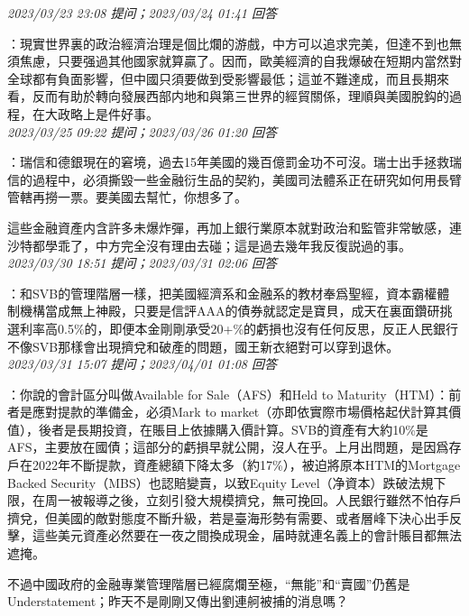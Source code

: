 \documentclass[twocolumn]{ctexart}
\begin{document}
\textit{\hfill\noindent\small 2023/03/23 23:08 提问；2023/03/24 01:41 回答}

：現實世界裏的政治經濟治理是個比爛的游戲，中方可以追求完美，但達不到也無須焦慮，只要强過其他國家就算贏了。因而，歐美經濟的自我爆破在短期内當然對全球都有負面影響，但中國只須要做到受影響最低；這並不難達成，而且長期來看，反而有助於轉向發展西部内地和與第三世界的經貿關係，理順與美國脫鈎的過程，在大政略上是件好事。
\\

\textit{\hfill\noindent\small 2023/03/25 09:22 提问；2023/03/26 01:20 回答}

：瑞信和德銀現在的窘境，過去15年美國的幾百億罰金功不可沒。瑞士出手拯救瑞信的過程中，必須撕毀一些金融衍生品的契約，美國司法體系正在研究如何用長臂管轄再撈一票。要美國去幫忙，你想多了。

這些金融資產内含許多未爆炸彈，再加上銀行業原本就對政治和監管非常敏感，連沙特都學乖了，中方完全沒有理由去碰；這是過去幾年我反復説過的事。
\\

\textit{\hfill\noindent\small 2023/03/30 18:51 提问；2023/03/31 02:06 回答}

：和SVB的管理階層一樣，把美國經濟系和金融系的教材奉爲聖經，資本霸權體制機構當成無上神殿，只要是信評AAA的債券就認定是寶貝，成天在裏面鑽研挑選利率高0.5\%的，即便本金剛剛承受20+\%的虧損也沒有任何反思，反正人民銀行不像SVB那樣會出現擠兌和破產的問題，國王新衣絕對可以穿到退休。
\\

\textit{\hfill\noindent\small 2023/03/31 15:07 提问；2023/04/01 01:08 回答}

：你說的會計區分叫做Available for Sale（AFS）和Held to Maturity（HTM）：前者是應對提款的準備金，必須Mark to market（亦即依實際市場價格起伏計算其價值），後者是長期投資，在賬目上依據購入價計算。SVB的資產有大約10\%是AFS，主要放在國債；這部分的虧損早就公開，沒人在乎。上月出問題，是因爲存戶在2022年不斷提款，資產總額下降太多（約17\%），被迫將原本HTM的Mortgage Backed Security（MBS）也認賠變賣，以致Equity Level（净資本）跌破法規下限，在周一被報導之後，立刻引發大規模擠兌，無可挽回。人民銀行雖然不怕存戶擠兌，但美國的敵對態度不斷升級，若是臺海形勢有需要、或者層峰下決心出手反擊，這些美元資產必然要在一夜之間換成現金，届時就連名義上的會計賬目都無法遮掩。

不過中國政府的金融專業管理階層已經腐爛至極，“無能”和“賣國”仍舊是Understatement；昨天不是剛剛又傳出劉連舸被捕的消息嗎？
\\
\end{document}
